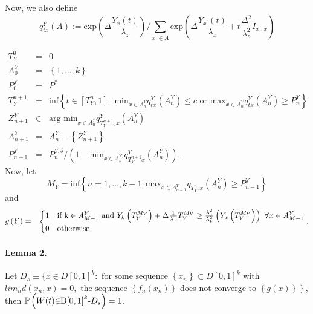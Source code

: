 \documentclass[12pt,english]{article}
\begin{document}
Now, we also define$ $
\[
q_{tx}^{Y}\left(A\right):=\mbox{exp}\left(\Delta\frac{Y_{x}\left(t\right)}{\lambda_{z}}\right)/\sum_{x^{'}\in A}\mbox{exp}\left(\Delta\frac{Y_{x^{'}}\left(t\right)}{\lambda_{z}}+t\frac{\Delta^{2}}{\lambda_{z}^{2}}I_{x',x}\right)
\]


\begin{eqnarray*}
T_{Y}^{0} & = & 0\\
A_{0}^{Y} & = & \left\{ 1,\ldots,k\right\} \\
P_{0}^{Y} & = & P^{*}\\
T_{Y}^{n+1} & = & \mbox{inf}\left\{ t\in\left[T_{Y}^{n},1\right]:\mbox{ min}_{x\in A_{n}^{Y}}q_{tx}^{Y}\left(A_{n}^{Y}\right)\leq c\mbox{ or }\mbox{max}_{x\in A_{n}^{Y}}q_{tx}^{Y}\left(A_{n}^{Y}\right)\geq P_{n}^{Y}\right\} \\
Z_{n+1}^{Y} & \in & \mbox{arg min}_{x\in A_{n}^{Y}}q_{T_{Y}^{n+1},x}^{Y}\left(A_{n}^{Y}\right)\\
A_{n+1}^{Y} & = & A_{n}^{Y}-\left\{ Z_{n+1}^{Y}\right\} \\
P_{n+1}^{Y} & = & P_{n}^{Y,\delta}/\left(1-\mbox{min}_{x\in A_{n}^{Y,}}q_{T_{Y}^{n+1}x}^{Y}\left(A_{n}^{Y}\right)\right).
\end{eqnarray*}
Now, let
\[
M_{Y}=\mbox{inf}\left\{ n=1,\ldots,k-1:\mbox{max}_{x\in A_{n-1}^{Y}}q_{T_{Y}^{n},x}\left(A_{n}^{Y}\right)\geq P_{n-1}^{Y}\right\} 
\]
and
\[
\]
\begin{eqnarray*}
g\left(Y\right) & = & \begin{cases}
1 & \mbox{if }\mbox{k}\in A_{M-1}^{Y}\mbox{ and }Y_{k}\left(T_{Y}^{M_{Y}}\right)+\Delta\frac{1}{\lambda_{z}}T_{Y}^{M_{Y}}\geq\frac{\lambda_{x}^{2}}{\lambda_{k}^{2}}\left(Y_{x}\left(T_{Y}^{M_{Y}}\right)\right)\mbox{ }\mbox{\ensuremath{\forall}}x\in A_{M-1}^{Y}\\
0 & \mbox{otherwise}
\end{cases}.
\end{eqnarray*}



\paragraph*{Lemma 2.}

Let $D_{s}\equiv\{x\in D\left[0,1\right]^{k}:\mbox{ for some sequence }\left\{ x_{n}\right\} \subset D\left[0,1\right]^{k}\mbox{ with }$
$lim_{n}d\left(x_{n},x\right)=0,\mbox{ the sequence }\left\{ f_{n}\left(x_{n}\right)\right\} $
does not converge to $\left\{ g\left(x\right)\right\} $$\left.\right\} $$ $,
then $ $$\mathbb{P}\left(W(t)\text{\ensuremath{\in}D\ensuremath{\left[0,1\right]^{k}}-}D_{s}\right)=1$.
\end{document}
